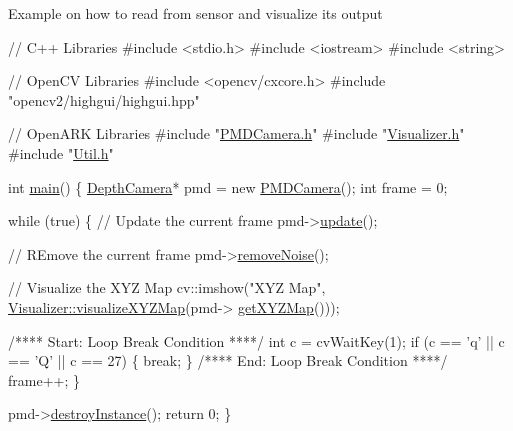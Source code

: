 Example on how to read from sensor and visualize its output 
\begin{DoxyCodeInclude}
\textcolor{comment}{// C++ Libraries}
\textcolor{preprocessor}{#include <stdio.h>}
\textcolor{preprocessor}{#include <iostream>}
\textcolor{preprocessor}{#include <string>}

\textcolor{comment}{// OpenCV Libraries}
\textcolor{preprocessor}{#include <opencv/cxcore.h>}
\textcolor{preprocessor}{#include "opencv2/highgui/highgui.hpp"}

\textcolor{comment}{// OpenARK Libraries}
\textcolor{preprocessor}{#include "\hyperlink{_p_m_d_camera_8h}{PMDCamera.h}"}
\textcolor{preprocessor}{#include "\hyperlink{_visualizer_8h}{Visualizer.h}"}
\textcolor{preprocessor}{#include "\hyperlink{_util_8h}{Util.h}"}

\textcolor{keywordtype}{int} \hyperlink{main_8cpp_ae66f6b31b5ad750f1fe042a706a4e3d4}{main}() \{
    \hyperlink{class_depth_camera}{DepthCamera}* pmd = \textcolor{keyword}{new} \hyperlink{class_p_m_d_camera_a9965c089ec7eea8537e249d432c1dbba}{PMDCamera}();
    \textcolor{keywordtype}{int} frame = 0;
    
    \textcolor{keywordflow}{while} (\textcolor{keyword}{true})
    \{
        \textcolor{comment}{// Update the current frame}
        pmd->\hyperlink{class_depth_camera_abae1b9f37a00b17f00ff983ebb43ffc5}{update}();

        \textcolor{comment}{// REmove the current frame}
        pmd->\hyperlink{class_depth_camera_adc06db6509cc5f47de1e168f56bf41fa}{removeNoise}();

        \textcolor{comment}{// Visualize the XYZ Map}
        cv::imshow(\textcolor{stringliteral}{"XYZ Map"}, \hyperlink{class_visualizer_a24caf117be9878e2f5ad35cabb7f4f88}{Visualizer::visualizeXYZMap}(pmd->
      \hyperlink{class_depth_camera_a0c295c5a0696550f453b1c8cd0fcb188}{getXYZMap}()));
        
        \textcolor{comment}{/**** Start: Loop Break Condition ****/}
        \textcolor{keywordtype}{int} c = cvWaitKey(1);
        \textcolor{keywordflow}{if} (c == \textcolor{charliteral}{'q'} || c == \textcolor{charliteral}{'Q'} || c == 27) \{
            \textcolor{keywordflow}{break};
        \}
        \textcolor{comment}{/**** End: Loop Break Condition ****/}
        frame++;
    \}

    pmd->\hyperlink{class_depth_camera_aaf7c09a863e906f61104f23af10a8597}{destroyInstance}();
    \textcolor{keywordflow}{return} 0;
\}
\end{DoxyCodeInclude}
 

